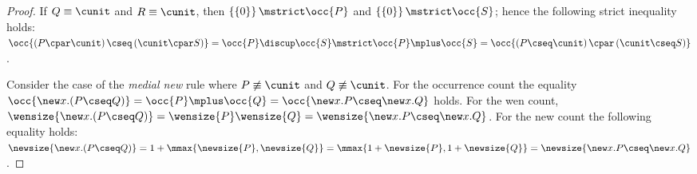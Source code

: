 \documentclass[UKenglish,acmsmall,authorversion]{acmart}
\theoremstyle{plain}
\begin{document}
\begin{proof}
If $Q \equiv \cunit$ and $R \equiv \cunit$, then $\left\{\left\{0\right\}\right\} \mstrict \occ{P}$ and $\left\{\left\{0\right\}\right\} \mstrict \occ{S}$; hence the following strict inequality holds:
$
\occ{\left(P \cpar \cunit\right) \cseq \left(\cunit \cpar S\right)}
= \occ{P} \discup \occ{S}
\mstrict \occ{P} \mplus \occ{S}
= \occ{\left(P \cseq \cunit \right) \cpar \left(\cunit \cseq S\right)}
$.




Consider the case of the \textit{medial new} rule where $P \not\equiv \cunit$ and $Q \not\equiv \cunit$. For the occurrence count the equality $\occ{ \mathopen{\new x.} \left( P \cseq Q \right) } = \occ{ P } \mplus \occ{ Q } = \occ{ \new x. P \cseq \new x.Q }$ holds.
For the wen count,
$\wensize{ \mathopen{\new x.} \left( P \cseq Q \right) } = 
\wensize{ P } \wensize{ Q } = 
\wensize{ \new x. P \cseq \new x. Q }$.
For the new count the following equality holds:
$
\newsize{ \mathopen{\new x.} \left( P \cseq Q \right) }
=
1 + \mmax{\newsize{ P }, \newsize{ Q }}
=
\mmax{ 1 + \newsize{ P }, 1 + \newsize{ Q }}
=
\newsize{ \new x. P \cseq \new x. Q }
$.




\end{proof}
\end{document}
